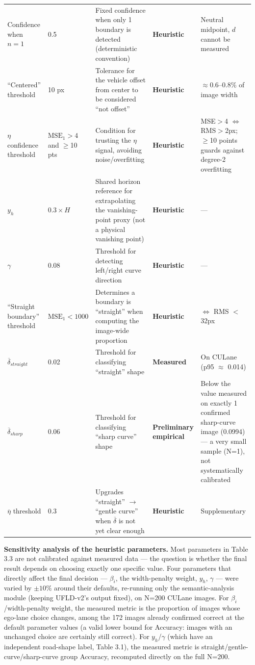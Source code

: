 \documentclass[12pt,a4paper]{report}
\begin{document}
\begin{longtable}{@{}p{1.6cm}p{2.4cm}p{4.0cm}p{2.0cm}p{4.4cm}@{}}
    Confidence when $n=1$ & 0.5 & Fixed confidence when only 1 boundary is detected (deterministic convention) & \textbf{Heuristic} & Neutral midpoint, $d$ cannot be measured \\
    ``Centered'' threshold & 10 px & Tolerance for the vehicle offset from center to be considered ``not offset'' & \textbf{Heuristic} & $\approx$0.6--0.8\% of image width \\
    $\eta$ confidence threshold & $\text{MSE}_1>4$ and $\ge$10 pts & Condition for trusting the $\eta$ signal, avoiding noise/overfitting & \textbf{Heuristic} & MSE$>$4 $\Leftrightarrow$ RMS$>$2px; $\ge$10 points guards against degree-2 overfitting \\
    $y_h$ & $0.3 \times H$ & Shared horizon reference for extrapolating the vanishing-point proxy (not a physical vanishing point) & \textbf{Heuristic} & --- \\
    $\gamma$ & 0.08 & Threshold for detecting left/right curve direction & \textbf{Heuristic} & --- \\
    ``Straight boundary'' threshold & $\text{MSE}_1 < 1000$ & Determines a boundary is ``straight'' when computing the image-wide proportion & \textbf{Heuristic} & $\Leftrightarrow$ RMS $<$ 32px \\
    $\overline{\delta}_{straight}$ & 0.02 & Threshold for classifying ``straight'' shape & \textbf{Measured} & On CULane (p95 $\approx$ 0.014) \\
    $\overline{\delta}_{sharp}$ & 0.06 & Threshold for classifying ``sharp curve'' shape & \textbf{Preliminary empirical} & Below the value measured on exactly 1 confirmed sharp-curve image (0.0994) --- a very small sample (N=1), not systematically calibrated \\
    $\overline{\eta}$ threshold & 0.3 & Upgrades ``straight'' $\to$ ``gentle curve'' when $\overline{\delta}$ is not yet clear enough & \textbf{Heuristic} & Supplementary \\
    \bottomrule
\end{longtable}

\textbf{Sensitivity analysis of the heuristic parameters.} Most parameters in Table 3.3 are not calibrated against measured data --- the question is whether the final result depends on choosing exactly one specific value. Four parameters that directly affect the final decision --- $\beta_i$, the width-penalty weight, $y_h$, $\gamma$ --- were varied by $\pm10\%$ around their defaults, re-running only the semantic-analysis module (keeping UFLD-v2's output fixed), on N=200 CULane images. For $\beta_i$/width-penalty weight, the measured metric is the proportion of images whose ego-lane choice changes, among the 172 images already confirmed correct at the default parameter values (a valid lower bound for Accuracy: images with an unchanged choice are certainly still correct). For $y_h$/$\gamma$ (which have an independent road-shape label, Table 3.1), the measured metric is straight/gentle-curve/sharp-curve group Accuracy, recomputed directly on the full N=200.
\end{document}
